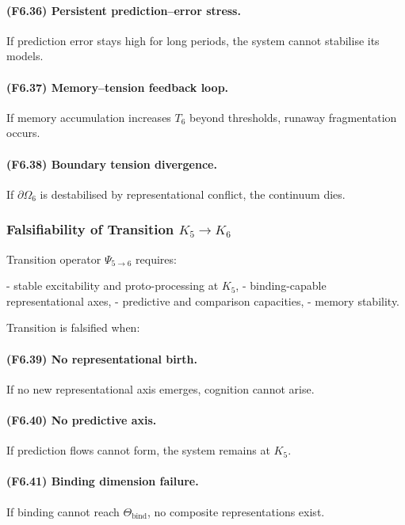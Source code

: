 \paragraph{(F6.36) Persistent prediction–error stress.}
If prediction error stays high for long periods,
the system cannot stabilise its models.

\paragraph{(F6.37) Memory–tension feedback loop.}
If memory accumulation increases $T_6$ beyond thresholds,
runaway fragmentation occurs.

\paragraph{(F6.38) Boundary tension divergence.}
If $\partial\Omega_6$ is destabilised by representational conflict,
the continuum dies.



\subsubsection{Falsifiability of Transition \texorpdfstring{$K_5 \to K_6$}{K_5 \to K_6}}

Transition operator $\Psi_{5\to 6}$ requires:

- stable excitability and proto-processing at $K_5$,
- binding-capable representational axes,
- predictive and comparison capacities,
- memory stability.

Transition is falsified when:

\paragraph{(F6.39) No representational birth.}
If no new representational axis emerges,
cognition cannot arise.

\paragraph{(F6.40) No predictive axis.}
If prediction flows cannot form,
the system remains at $K_5$.

\paragraph{(F6.41) Binding dimension failure.}
If binding cannot reach $\Theta_{\mathrm{bind}}$,
no composite representations exist.

